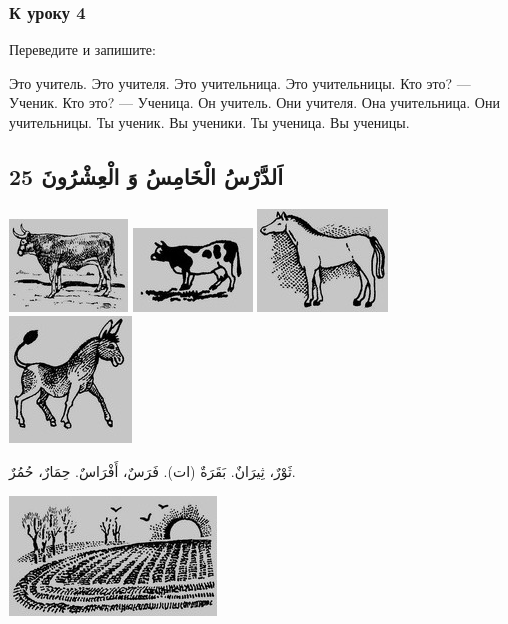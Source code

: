 \documentclass[a5paper]{article}
\begin{document}
\subsubsection{К уроку 4}
Переведите и запишите:

Это учитель. Это учителя. Это учительница. Это учительницы. Кто это? — Ученик. Кто это? — Ученица. Он учитель. Они учителя. Она учительница. Они учительницы. Ты ученик. Вы ученики. Ты ученица. Вы ученицы.

\subsection{25 اَلدَّرْسُ الْخَامِسُ وَ الْعِشْرُونَ}
 \includegraphics[width=1.2398in,height=0.9689in]{images/MuhammadBagauddinprettified-img045.jpg}   \includegraphics[width=1.25in,height=0.8752in]{images/MuhammadBagauddinprettified-img046.jpg}   \includegraphics[width=1.3646in,height=1.0728in]{images/MuhammadBagauddinprettified-img047.jpg}   \includegraphics[width=1.2811in,height=1.3228in]{images/MuhammadBagauddinprettified-img048.jpg} 

ثَوْرٌ، ثِيرَانٌ. بَقَرَةٌ (ات). فَرَسٌ، أَفْرَاسٌ. حِمَارٌ، حُمُرٌ. 

 \includegraphics[width=2.1665in,height=1.25in]{images/MuhammadBagauddinprettified-img049.jpg} 
\end{document}
